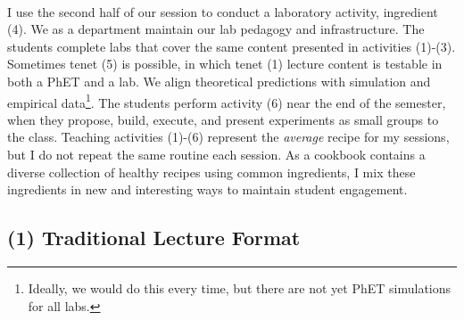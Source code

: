 \documentclass[../../../main.tex]{subfiles}
\begin{document}
\\
\vspace{0.15cm}
I use the second half of our session to conduct a laboratory activity, ingredient (4).  We as a department maintain our lab pedagogy and infrastructure.  The students complete labs that cover the same content presented in activities (1)-(3).  Sometimes tenet (5) is possible, in which tenet (1) lecture content is testable in both a PhET and a lab.  We align theoretical predictions with simulation and empirical data\footnote{Ideally, we would do this every time, but there are not yet PhET simulations for all labs.}.  The students perform activity (6) near the end of the semester, when they propose, build, execute, and present experiments as small groups to the class.  Teaching activities (1)-(6) represent the \textit{average} recipe for my sessions, but I do not repeat the same routine each session.  As a cookbook contains a diverse collection of healthy recipes using common ingredients, I mix these ingredients in new and interesting ways to maintain student engagement.

\subsection{(1) Traditional Lecture Format}
\end{document}
